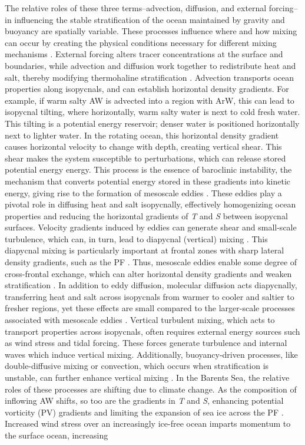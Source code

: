 \documentclass[draft]{agujournal2019}
\begin{document}
The relative roles of these three terms--advection, diffusion, and external forcing--in influencing the stable stratification of the ocean maintained by gravity and buoyancy are spatially variable. These processes influence where and how mixing can occur by creating the physical conditions necessary for different mixing mechanisms \cite{StoleHansen1991,Speer1993,long2017}. External forcing alters tracer concentrations at the surface and boundaries, while advection and diffusion work together to redistribute heat and salt, thereby modifying thermohaline stratification \cite{Munk1966}. Advection transports ocean properties along isopycnals, and can establish horizontal density gradients. For example, if warm salty AW is advected into a region with ArW, this can lead to isopycnal tilting, where horizontally, warm salty water is next to cold fresh water. This tilting is a potential energy reservoir; denser water is positioned horizontally next to lighter water. In the rotating ocean, this horizontal density gradient causes horizontal velocity to change with depth, creating vertical shear. This shear makes the system susceptible to perturbations, which can release stored potential energy energy. This process is the essence of baroclinic instability, the mechanism that converts potential energy stored in these gradients into kinetic energy, giving rise to the formation of mesoscale eddies \cite{Vallis2006}. These eddies play a pivotal role in diffusing heat and salt isopycnally, effectively homogenizing ocean properties and reducing the horizontal gradients of \emph{T} and \emph{S} between isopycnal surfaces. Velocity gradients induced by eddies can generate shear and small-scale turbulence, which can, in turn, lead to diapycnal (vertical) mixing \cite{Vallis2006}. This diapycnal mixing is particularly important at frontal zones with sharp lateral density gradients, such as the PF \cite{Oziel2016}. Thus, mesoscale eddies enable some degree of cross-frontal exchange, which can alter horizontal density gradients and weaken stratification \cite{kolas2024}. In addition to eddy diffusion, molecular diffusion acts diapycnally, transferring heat and salt across isopycnals from warmer to cooler and saltier to fresher regions, yet these effects are small compared to the larger-scale processes associated with mesoscale eddies \cite{Kagan2015}. Vertical turbulent mixing, which acts to transport properties across isopycnals, often requires external energy sources such as wind stress and tidal forcing. These forces generate turbulence and internal waves which induce vertical mixing. Additionally, buoyancy-driven processes, like double-diffusive mixing or convection, which occurs when stratification is unstable, can further enhance vertical mixing \cite{Vallis2006}. In the Barents Sea, the relative roles of these processes are shifting due to climate change. As the composition of inflowing AW shifts, so too are the gradients in \emph{T} and \emph{S}, enhancing potential vorticity (PV) gradients and limiting the expansion of sea ice across the PF \cite{Oziel2016,Barton18}. Increased wind stress over an increasingly ice-free ocean imparts momentum to the surface ocean, increasing 
\end{document}
